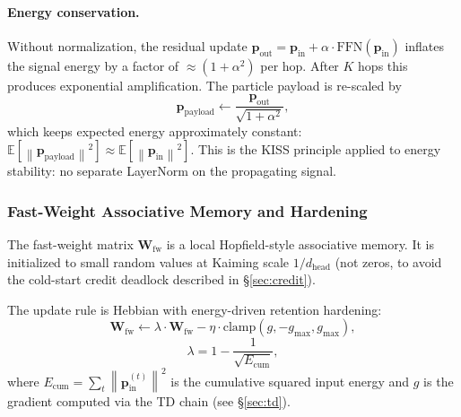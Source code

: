 \documentclass[11pt,a4paper]{article}
\theoremstyle{definition}
\newcommand{\vp}{\mathbf{p}}
\newcommand{\mW}{\mathbf{W}}
\newcommand{\E}{\mathbb{E}}
\newcommand{\norm}[1]{\left\lVert #1 \right\rVert}
\newcommand{\clamp}{\mathrm{clamp}}
\begin{document}
\paragraph{Energy conservation.}
Without normalization, the residual update
$\vp_\text{out} = \vp_\text{in} + \alpha \cdot \text{FFN}(\vp_\text{in})$ inflates the
signal energy by a factor of $\approx(1+\alpha^2)$ per hop.
After $K$ hops this produces exponential amplification.
The particle payload is re-scaled by
\begin{equation}
  \vp_\text{payload} \leftarrow \frac{\vp_\text{out}}{\sqrt{1 + \alpha^2}},
  \label{eq:scale}
\end{equation}
which keeps expected energy approximately constant:
$\E[\norm{\vp_\text{payload}}^2] \approx \E[\norm{\vp_\text{in}}^2]$.
This is the KISS principle applied to energy stability: no separate LayerNorm on the propagating
signal.

\subsubsection{Fast-Weight Associative Memory and Hardening}
\label{sec:fastweight}

The fast-weight matrix $\mW_\text{fw}$ is a local Hopfield-style associative memory.
It is initialized to small random values at Kaiming scale $1/d_\text{head}$
(not zeros, to avoid the cold-start credit deadlock described in \S\ref{sec:credit}).

The update rule is Hebbian with energy-driven retention hardening:
\begin{equation}
  \mW_\text{fw} \leftarrow \lambda \cdot \mW_\text{fw} - \eta \cdot \clamp\!\left(g, -g_\text{max}, g_\text{max}\right),
  \label{eq:fwupdate}
\end{equation}
\begin{equation}
  \lambda = 1 - \frac{1}{\sqrt{E_\text{cum}}},
  \label{eq:lambda}
\end{equation}
where $E_\text{cum} = \sum_t \norm{\vp_\text{in}^{(t)}}^2$ is the cumulative squared input energy
and $g$ is the gradient computed via the TD chain (see \S\ref{sec:td}).
\end{document}
